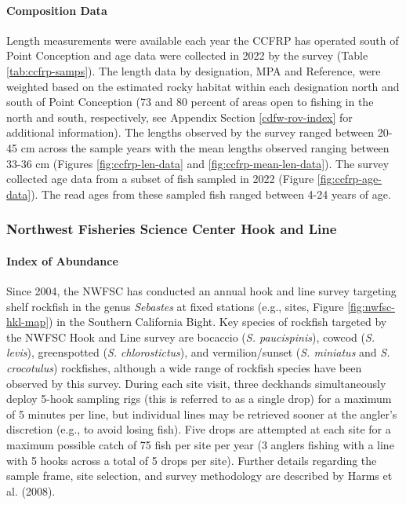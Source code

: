 \documentclass[11pt,
  english,
  letterpaper,
]{article}
\begin{document}
\hypertarget{composition-data-2}{%
\paragraph{Composition Data}\label{composition-data-2}}

\hfill\break

Length measurements were available each year the CCFRP has operated south of Point Conception and age data were collected in 2022 by the survey (Table \ref{tab:ccfrp-samps}). The length data by designation, MPA and Reference, were weighted based on the estimated rocky habitat within each designation north and south of Point Conception (73 and 80 percent of areas open to fishing in the north and south, respectively, see Appendix Section \ref{cdfw-rov-index} for additional information). The lengths observed by the survey ranged between 20-45 cm across the sample years with the mean lengths observed ranging between 33-36 cm (Figures \ref{fig:ccfrp-len-data} and \ref{fig:ccfrp-mean-len-data}). The survey collected age data from a subset of fish sampled in 2022 (Figure \ref{fig:ccfrp-age-data}). The read ages from these sampled fish ranged between 4-24 years of age.

\hypertarget{northwest-fisheries-science-center-hook-and-line}{%
\subsubsection{Northwest Fisheries Science Center Hook and Line}\label{northwest-fisheries-science-center-hook-and-line}}

\hypertarget{index-of-abundance-1}{%
\paragraph{Index of Abundance}\label{index-of-abundance-1}}

\hfill\break

Since 2004, the NWFSC has conducted an annual hook and line survey targeting shelf rockfish in the genus \emph{Sebastes} at fixed stations (e.g., sites, Figure \ref{fig:nwfsc-hkl-map}) in the Southern California Bight. Key species of rockfish targeted by the NWFSC Hook and Line survey are bocaccio (\emph{S. paucispinis}), cowcod (\emph{S. levis}), greenspotted (\emph{S. chlorostictus}), and vermilion/sunset (\emph{S. miniatus} and \emph{S. crocotulus}) rockfishes, although a wide range of rockfish species have been observed by this survey. During each site visit, three deckhands simultaneously deploy 5-hook sampling rigs (this is referred to as a single drop) for a maximum of 5 minutes per line, but individual lines may be retrieved sooner at the angler's discretion (e.g., to avoid losing fish). Five drops are attempted at each site for a maximum possible catch of 75 fish per site per year (3 anglers fishing with a line with 5 hooks across a total of 5 drops per site). Further details regarding the sample frame, site selection, and survey methodology are described by Harms et al. (2008).
\end{document}
